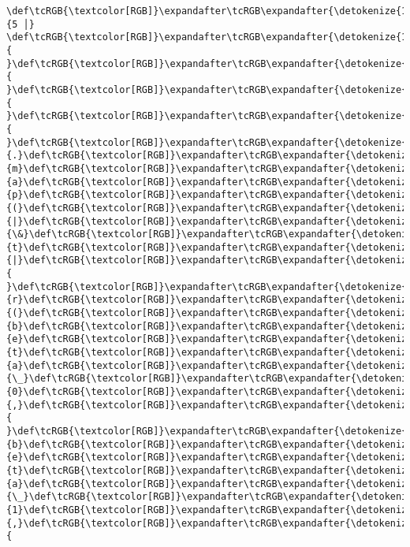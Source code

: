 \documentclass[11pt]{article}
\begin{document}
\begin{Verbatim}[commandchars=\\\{\}, frame=single, framerule=2mm, rulecolor=\color{outerrorbackground}]
 \def\tcRGB{\textcolor[RGB]}\expandafter\tcRGB\expandafter{\detokenize{148,148,148}}{5 │} \def\tcRGB{\textcolor[RGB]}\expandafter\tcRGB\expandafter{\detokenize{178,178,178}}{ }\def\tcRGB{\textcolor[RGB]}\expandafter\tcRGB\expandafter{\detokenize{178,178,178}}{ }\def\tcRGB{\textcolor[RGB]}\expandafter\tcRGB\expandafter{\detokenize{178,178,178}}{ }\def\tcRGB{\textcolor[RGB]}\expandafter\tcRGB\expandafter{\detokenize{178,178,178}}{ }\def\tcRGB{\textcolor[RGB]}\expandafter\tcRGB\expandafter{\detokenize{178,178,178}}{.}\def\tcRGB{\textcolor[RGB]}\expandafter\tcRGB\expandafter{\detokenize{178,178,178}}{m}\def\tcRGB{\textcolor[RGB]}\expandafter\tcRGB\expandafter{\detokenize{178,178,178}}{a}\def\tcRGB{\textcolor[RGB]}\expandafter\tcRGB\expandafter{\detokenize{178,178,178}}{p}\def\tcRGB{\textcolor[RGB]}\expandafter\tcRGB\expandafter{\detokenize{178,178,178}}{(}\def\tcRGB{\textcolor[RGB]}\expandafter\tcRGB\expandafter{\detokenize{178,178,178}}{|}\def\tcRGB{\textcolor[RGB]}\expandafter\tcRGB\expandafter{\detokenize{178,178,178}}{\&}\def\tcRGB{\textcolor[RGB]}\expandafter\tcRGB\expandafter{\detokenize{178,178,178}}{t}\def\tcRGB{\textcolor[RGB]}\expandafter\tcRGB\expandafter{\detokenize{178,178,178}}{|}\def\tcRGB{\textcolor[RGB]}\expandafter\tcRGB\expandafter{\detokenize{178,178,178}}{ }\def\tcRGB{\textcolor[RGB]}\expandafter\tcRGB\expandafter{\detokenize{178,178,178}}{r}\def\tcRGB{\textcolor[RGB]}\expandafter\tcRGB\expandafter{\detokenize{178,178,178}}{(}\def\tcRGB{\textcolor[RGB]}\expandafter\tcRGB\expandafter{\detokenize{178,178,178}}{b}\def\tcRGB{\textcolor[RGB]}\expandafter\tcRGB\expandafter{\detokenize{178,178,178}}{e}\def\tcRGB{\textcolor[RGB]}\expandafter\tcRGB\expandafter{\detokenize{178,178,178}}{t}\def\tcRGB{\textcolor[RGB]}\expandafter\tcRGB\expandafter{\detokenize{178,178,178}}{a}\def\tcRGB{\textcolor[RGB]}\expandafter\tcRGB\expandafter{\detokenize{178,178,178}}{\_}\def\tcRGB{\textcolor[RGB]}\expandafter\tcRGB\expandafter{\detokenize{178,178,178}}{0}\def\tcRGB{\textcolor[RGB]}\expandafter\tcRGB\expandafter{\detokenize{178,178,178}}{,}\def\tcRGB{\textcolor[RGB]}\expandafter\tcRGB\expandafter{\detokenize{178,178,178}}{ }\def\tcRGB{\textcolor[RGB]}\expandafter\tcRGB\expandafter{\detokenize{178,178,178}}{b}\def\tcRGB{\textcolor[RGB]}\expandafter\tcRGB\expandafter{\detokenize{178,178,178}}{e}\def\tcRGB{\textcolor[RGB]}\expandafter\tcRGB\expandafter{\detokenize{178,178,178}}{t}\def\tcRGB{\textcolor[RGB]}\expandafter\tcRGB\expandafter{\detokenize{178,178,178}}{a}\def\tcRGB{\textcolor[RGB]}\expandafter\tcRGB\expandafter{\detokenize{178,178,178}}{\_}\def\tcRGB{\textcolor[RGB]}\expandafter\tcRGB\expandafter{\detokenize{178,178,178}}{1}\def\tcRGB{\textcolor[RGB]}\expandafter\tcRGB\expandafter{\detokenize{178,178,178}}{,}\def\tcRGB{\textcolor[RGB]}\expandafter\tcRGB\expandafter{\detokenize{178,178,178}}{ 
\end{Verbatim}
\end{document}
